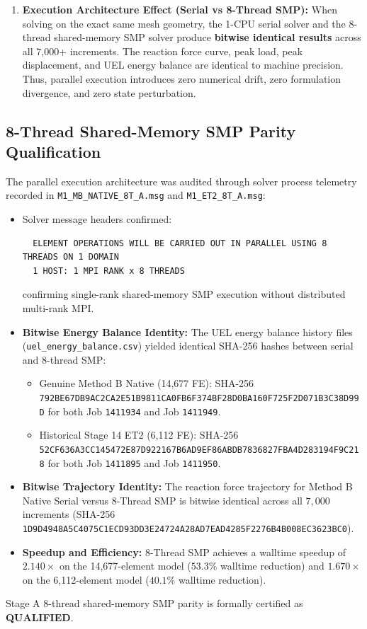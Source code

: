 \begin{enumerate}
  \item \textbf{Execution Architecture Effect (Serial vs 8-Thread SMP):}
  When solving on the exact same mesh geometry, the 1-CPU serial solver and the 8-thread shared-memory SMP solver produce \textbf{bitwise identical results} across all 7,000+ increments. The reaction force curve, peak load, peak displacement, and UEL energy balance are identical to machine precision. Thus, parallel execution introduces zero numerical drift, zero formulation divergence, and zero state perturbation.
\end{enumerate}

\subsection{8-Thread Shared-Memory SMP Parity Qualification}
\label{subsec:gate6b_smp_parity}

The parallel execution architecture was audited through solver process telemetry recorded in \texttt{M1\_MB\_NATIVE\_8T\_A.msg} and \texttt{M1\_ET2\_8T\_A.msg}:
\begin{itemize}
  \item Solver message headers confirmed:
  \begin{verbatim}
  ELEMENT OPERATIONS WILL BE CARRIED OUT IN PARALLEL USING 8 THREADS ON 1 DOMAIN
  1 HOST: 1 MPI RANK x 8 THREADS
  \end{verbatim}
  confirming single-rank shared-memory SMP execution without distributed multi-rank MPI.
  \item \textbf{Bitwise Energy Balance Identity:} The UEL energy balance history files (\texttt{uel\_energy\_balance.csv}) yielded identical SHA-256 hashes between serial and 8-thread SMP:
  \begin{itemize}
    \item Genuine Method B Native (14,677 FE): SHA-256 \texttt{792BE67DB9AC2CA2E51B9811CA0FB6F374BF28D0BA160F725F2D071B3C38D99D} for both Job \texttt{1411934} and Job \texttt{1411949}.
    \item Historical Stage 14 ET2 (6,112 FE): SHA-256 \texttt{52CF636A3CC145472E87D922167B6AD9EF86ABDB7836827FBA4D283194F9C218} for both Job \texttt{1411895} and Job \texttt{1411950}.
  \end{itemize}
  \item \textbf{Bitwise Trajectory Identity:} The reaction force trajectory for Method B Native Serial versus 8-Thread SMP is bitwise identical across all $7{,}000$ increments (SHA-256 \texttt{1D9D4948A5C4075C1ECD93DD3E24724A28AD7EAD4285F2276B4B008EC3623BC0}).
  \item \textbf{Speedup and Efficiency:} 8-Thread SMP achieves a walltime speedup of $\mathbf{2.140\times}$ on the 14,677-element model ($53.3\%$ walltime reduction) and $\mathbf{1.670\times}$ on the 6,112-element model ($40.1\%$ walltime reduction).
\end{itemize}
Stage A 8-thread shared-memory SMP parity is formally certified as \textbf{QUALIFIED}.

